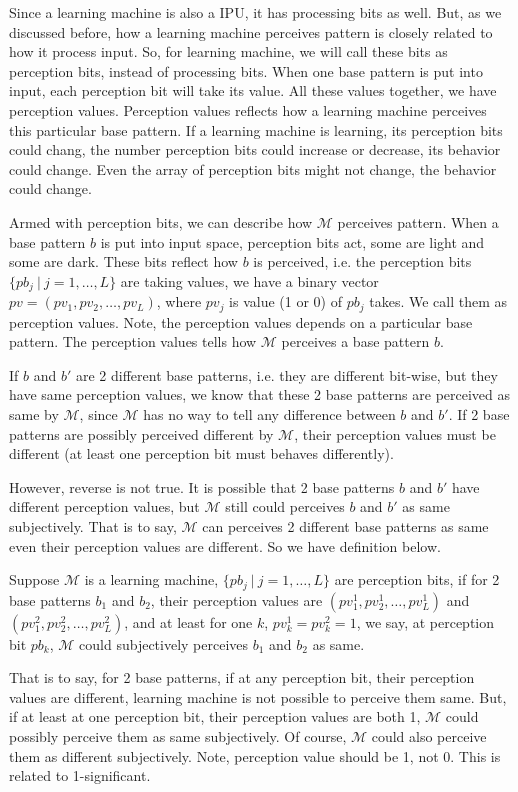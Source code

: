 Since a learning machine is also a IPU, it has processing bits as well. But, as we discussed before, how a learning machine perceives pattern is closely related to how it process input. So, for learning machine, we will call these bits as perception bits, instead of processing bits. When one base pattern is put into input, each perception bit will take its value. All these values together, we have perception values. Perception values reflects how a learning machine perceives this particular base pattern. If a learning machine is learning, its perception bits could chang, the number perception bits could increase or decrease, its behavior could change. Even the array of perception bits might not change, the behavior could change. 

Armed with perception bits, we can describe how $\mathcal{M}$ perceives pattern. When a base pattern $b$ is put into input space, perception bits act, some are light and some are dark. These bits reflect how $b$ is perceived, i.e. the perception bits $\{pb_j \ |\ j=1, \ldots, L\}$ are taking values, we have a binary vector $pv = (pv_1, pv_2, \ldots, pv_L)$, where $pv_j$ is value (1 or 0) of $pb_j$ takes. We call them as perception values. Note, the perception values depends on a particular base pattern. The perception values tells how $\mathcal{M}$ perceives a base pattern $b$. 

If $b$ and $b'$ are 2 different base patterns, i.e. they are different bit-wise, but they have same perception values, we know that these 2 base patterns are perceived as same by $\mathcal{M}$, since $\mathcal{M}$ has no way to tell any difference between $b$ and $b'$. If 2 base patterns are possibly perceived different by $\mathcal{M}$, their perception values must be different (at least one perception bit must behaves differently). 


However, reverse is not true. It is possible that 2 base patterns $b$ and $b'$ have different perception values, but $\mathcal{M}$ still could perceives $b$ and $b'$ as same subjectively. That is to say, $\mathcal{M}$ can perceives 2 different base patterns as same even their perception values are different. So we have definition below.


\begin{definition}
Suppose $\mathcal{M}$ is a learning machine, $\{pb_j \ |\ j = 1, \ldots, L\}$ are perception bits, if for 2 base patterns $b_1$ and $b_2$, their perception values are $(pv^1_1, pv^1_2, \ldots, pv^1_L)$ and $(pv^2_1, pv^2_2, \ldots, pv^2_L)$, and at least for one $k$, $pv^1_k = pv^2_k = 1$, we say, at perception bit $pb_k$, $\mathcal{M}$ could subjectively perceives $b_1$ and $b_2$ as same. 
\end{definition}
That is to say, for 2 base patterns, if at any perception bit, their perception values are different, learning machine is not possible to perceive them same. But, if at least at one perception bit, their perception values are both 1, $\mathcal{M}$ could possibly perceive them as same subjectively. Of course, $\mathcal{M}$ could also perceive them as different subjectively. Note, perception value should be 1, not 0. This is related to 1-significant. 


